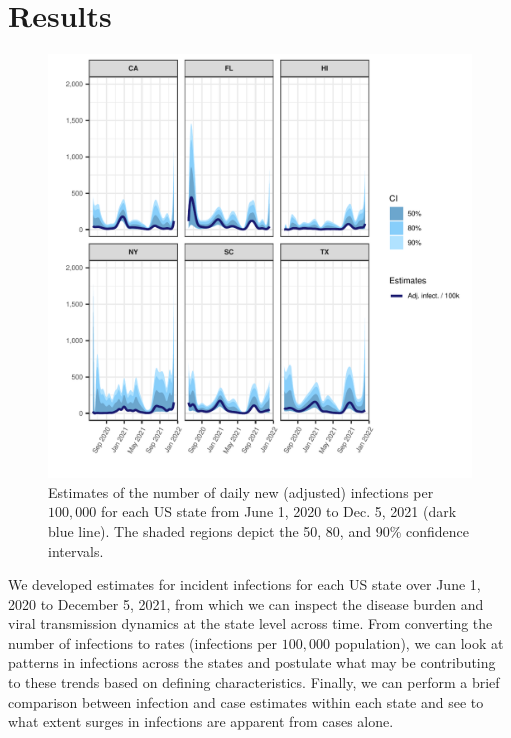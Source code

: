 \documentclass{article}
\begin{document}
\section{Results}

\begin{figure}[!tb]
\centering
    \includegraphics[width=.99\textwidth]{state_nia_est_faceted.pdf} %
    \caption{Estimates of the number of daily new (adjusted) infections per $100,000$ for each US state from June 1, 2020 to Dec. 5, 2021 (dark blue line). The shaded regions depict the 50, 80, and 90\% confidence intervals.}
    \label{fig:state_nia_est_faceted}
\end{figure}

We developed estimates for incident infections for each US state over June 1, 2020 to December 5, 2021, from which we can inspect the disease burden and viral transmission dynamics at the state level across time. From converting the number of infections to rates (infections per $100,000$ population), we can look at patterns in infections across the states and postulate what may be contributing to these trends based on defining characteristics. Finally, we can perform a brief comparison between infection and case estimates within each state and see to what extent surges in infections are apparent from cases alone. %
\end{document}
